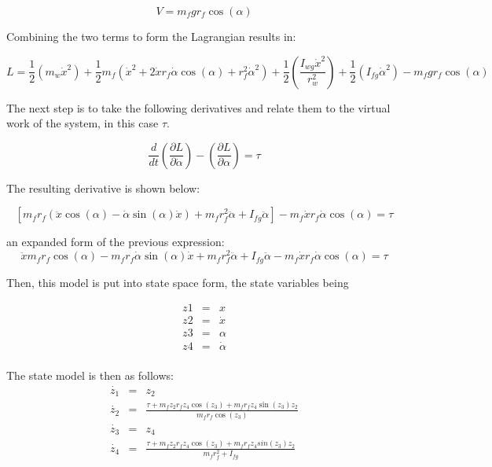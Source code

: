 \documentclass{article}
\begin{document}
\begin{equation}
V = m_{f} g r_{f} \cos(\alpha)
\end{equation}

Combining the two terms to form the Lagrangian results in:

 \begin{equation}
 L = \frac{1}{2} (m_{w} \dot{x}^2) + \frac{1}{2} m_{f} (\dot{x}^2 + 2 \dot{x} r_{f} \dot{\alpha} \cos(\alpha)   + r_{f}^2 \dot{\alpha}^2)  + \frac{1}{2} \left(   \frac{I_{wg} \dot{x}^2}     {r_{w}^2  } \right) + \frac{1}{2} (I_{fg} \dot{\alpha}^2 ) - m_{f} g r_{f} \cos(\alpha)
 \end{equation}

The next step is to take the following derivatives and relate them to the virtual work of the system, in this case $\tau$.

\begin{equation}
 \frac{d}{dt} \left( \frac{\partial L}{\partial \dot{\alpha}} \right) - \left( \frac{\partial L}{\partial \alpha} \right) = \tau 
 \end{equation}
 
 The resulting derivative is shown below:

\begin{equation}
 \left[ m_{f} r_{f}  ( \ddot{x} \cos(\alpha) - \dot{\alpha} \sin(\alpha) \dot{x}) + m_{f} r_{f}^2 \ddot{\alpha} + I_{fg} \ddot{\alpha} \right] - m_{f} \dot{x} r_{f} \dot{\alpha} \cos(\alpha) = \tau
 \end{equation}

an expanded form of the previous expression:
\begin{equation}
 \ddot{x} m_{f} r_{f} \cos(\alpha) - m_{f} r_{f} \dot{\alpha} \sin(\alpha) \dot{x} + m_{f} r_{f}^2 \ddot{\alpha} + I_{fg} \ddot{\alpha} - m_{f} \dot{x} r_{f} \dot{\alpha} \cos(\alpha) = \tau       
\end{equation}

Then, this model is put into state space form, the state variables being

\begin{eqnarray}
z1 &=& x \nonumber \\
z2 &=& \dot{x} \nonumber \\
z3 &=& \alpha \nonumber \\
z4 &=& \dot{\alpha} \nonumber \\
\end{eqnarray}

The state model is then as follows:
\begin{eqnarray}
\dot{z_{1}} &=& z_{2} \nonumber \\
\dot{z_{2}} &=& \frac{\tau + m_{f} z_{2} r_{f} z_{4}  \cos(z_{3}) + m_{f} r_{f} z_{4} \sin(z_{3}) z_{2}}{m_{f} r_{f} \cos(z_{3})} \nonumber \\
\dot{z_{3}} &=& z_{4} \nonumber \\
\dot{z_{4}} &=& \frac{\tau + m_{f} z_{2} r_{f} z_{4} \cos(z_{3}) + m_{f} r_{f} z_{4} sin(z_{3}) z_{2}}{m_{f} r_{f}^2 + I_{fg}} \nonumber \\
\end{eqnarray}
\end{document}
